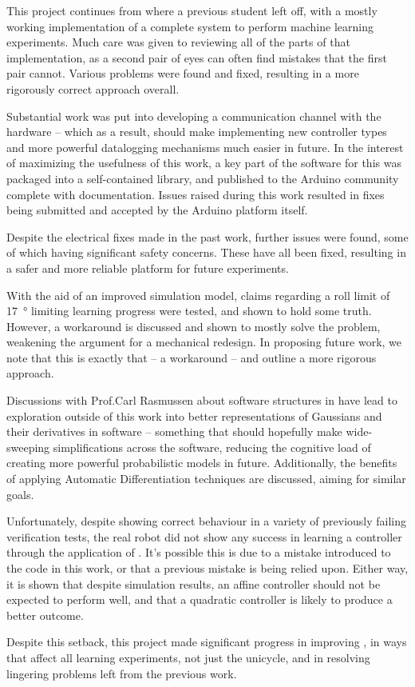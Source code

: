 \documentclass[main.tex]{subfiles}
\begin{document}
This project continues from where a previous student left off, with a mostly working implementation of a complete system to perform machine learning experiments.
Much care was given to reviewing all of the parts of that implementation, as a second pair of eyes can often find mistakes that the first pair cannot.
Various problems were found and fixed, resulting in a more rigorously correct approach overall.

Substantial work was put into developing a communication channel with the hardware -- which as a result, should make implementing new controller types and more powerful datalogging mechanisms much easier in future.
In the interest of maximizing the usefulness of this work, a key part of the software for this was packaged into a self-contained library, and published to the Arduino community complete with documentation.
Issues raised during this work resulted in fixes being submitted and accepted by the Arduino platform itself.

Despite the electrical fixes made in the past work, further issues were found, some of which having significant safety concerns.
These have all been fixed, resulting in a safer and more reliable platform for future experiments.

With the aid of an improved simulation model, claims regarding a roll limit of \SI{17}{\degree} limiting learning progress were tested, and shown to hold some truth.
However, a workaround is discussed and shown to mostly solve the problem, weakening the argument for a mechanical redesign.
In proposing future work, we note that this is exactly that -- a workaround -- and outline a more rigorous approach.

Discussions with Prof.\@ Carl Rasmussen about software structures in {\Pilco} have lead to exploration outside of this work into better representations of Gaussians and their derivatives in software -- something that should hopefully make wide-sweeping simplifications across the software, reducing the cognitive load of creating more powerful probabilistic models in future.
Additionally, the benefits of applying Automatic Differentiation techniques are discussed, aiming for similar goals.

Unfortunately, despite showing correct behaviour in a variety of previously failing verification tests, the real robot did not show any success in learning a controller through the application of {\Pilco}.
It's possible this is due to a mistake introduced to the code in this work, or that a previous mistake is being relied upon.
Either way, it is shown that despite simulation results, an affine controller should not be expected to perform well, and that a quadratic controller is likely to produce a better outcome.

Despite this setback, this project made significant progress in improving \Pilco, in ways that affect all learning experiments, not just the unicycle, and in resolving lingering problems left from the previous work.
\end{document}
